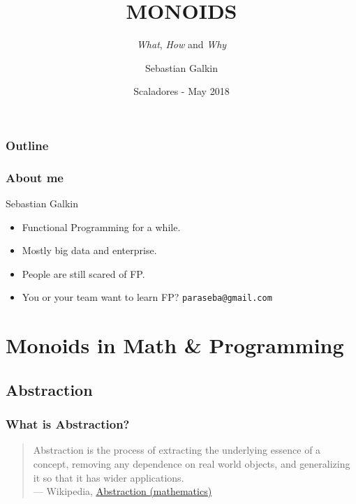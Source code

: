 \documentclass{beamer}
\title[Monoids]{MONOIDS}
\subtitle{\textit{What}, \textit{How} and \textit{Why}}
\author{Sebastian Galkin}
\institute[@paraseba]{\texttt{@paraseba} \\ \texttt{paraseba@gmail.com}}
\date[Scaladores]{Scaladores - May 2018}
\begin{document}


\begin{frame}
  \titlepage
\end{frame}

\begin{frame}
  \frametitle{Outline}
 \tableofcontents
\end{frame}


\begin{frame}
  \frametitle{About me}

  {\LARGE Sebastian Galkin}

  \begin{itemize}
  \item \alert{Functional Programming} for a while.
  \item Mostly big data and enterprise.
  \item People are still scared of FP.
  \item You or your team want to learn FP?
  \color{blue}\texttt{paraseba@gmail.com}
  \end{itemize}


\end{frame}

\section{Monoids in Math \& Programming}
\subsection{Abstraction}

\begin{frame}
  \frametitle{What is Abstraction?}
  \begin{quote}
\alert{Abstraction} is the process of extracting the underlying \alert{essence} of a concept,
removing any \alert{dependence} on real world objects, and \alert{generalizing} it so that it
has \alert{wider applications.}\\[2ex] \rightline
  {{\rm --- Wikipedia, \href{https://en.wikipedia.org/wiki/Abstraction_(mathematics)}{\underline{Abstraction (mathematics)}}}}
  \end{quote}
\end{frame}
\end{document}
